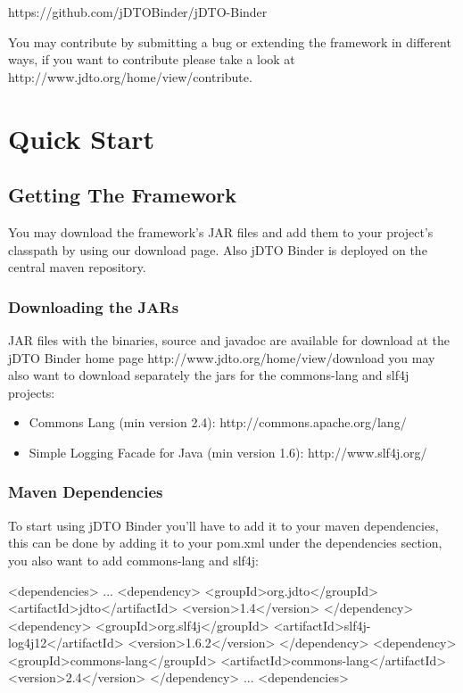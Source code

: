 \documentclass[11pt]{article}
\newcommand{\JDTO}{jDTO Binder\xspace}
\begin{document}
https://github.com/jDTOBinder/jDTO-Binder

You may contribute by submitting a bug or extending the framework in different ways, if you want to contribute please take a look at http://www.jdto.org/home/view/contribute.


\clearpage

\section{Quick Start}

\subsection{Getting The Framework}

You may download the framework's JAR files and add them to your project's classpath by using our download page. Also jDTO Binder is deployed on the central maven repository.

\subsubsection{Downloading the JARs}

JAR files with the binaries, source and javadoc are available for download at the \JDTO home page http://www.jdto.org/home/view/download you may also want to download separately the jars for the commons-lang and slf4j projects:

\begin{itemize}
\item Commons Lang (min version 2.4): http://commons.apache.org/lang/
\item Simple Logging Facade for Java (min version 1.6): http://www.slf4j.org/
\end{itemize}

\subsubsection{Maven Dependencies}

To start using \JDTO you'll have to add it to your maven dependencies, this can be done
by adding it to your pom.xml under the dependencies section, you also want to add commons-lang and slf4j:

\begin{xml}
     <dependencies>
     ...
        <dependency>
            <groupId>org.jdto</groupId>
            <artifactId>jdto</artifactId>
            <version>1.4</version>
        </dependency>
        <dependency>
            <groupId>org.slf4j</groupId>
            <artifactId>slf4j-log4j12</artifactId>
            <version>1.6.2</version>
        </dependency>
        <dependency>
            <groupId>commons-lang</groupId>
            <artifactId>commons-lang</artifactId>
            <version>2.4</version>
        </dependency>
     ...
     <dependencies>
\end{xml}
\end{document}
